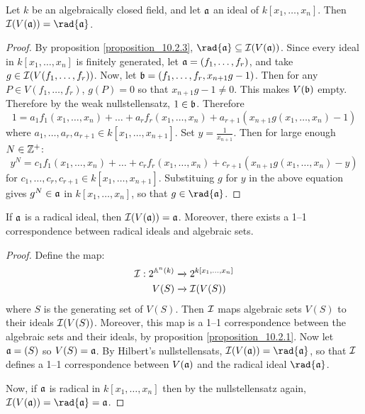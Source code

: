 \begin{theorem}\label{theorem_10.5.2}
  Let $k$ be an algebraically closed field, and let $\af$ an ideal of
  $k[x_1, \dots, x_n]$. Then $\Ic(V(\af))=\rad{\af}$.
\end{theorem}
\begin{proof}
  By proposition \ref{proposition_10.2.3}, $\rad{\af} \subseteq
  \Ic(V(\af))$. Since every ideal in $k[x_1, \dots, x_n]$ is finitely
  generated, let $\af=(f_1, \dots, f_r)$, and take $g \in \Ic(V(f_1,
  \dots, f_r))$. Now, let $\bf=(f_1, \dots, f_r, x_{n+1}g-1)$. Then
  for any $P \in V(f_1, \dots, f_r)$, $g(P)=0$ so that $x_{n+1}g-1
  \neq 0$. This makes $V(\bf)$ empty. Therefore by the weak
  nullstellensatz, $1 \in \bf$. Therefore
  \begin{equation*}
    1=a_1f_1(x_1, \dots, x_n)+\dots+a_rf_r(x_1, \dots, x_n)+
    a_{r+1}(x_{n+1}g(x_1, \dots, x_n)-1)
  \end{equation*}
  where $a_1, \dots, a_r,a_{r+1} \in k[x_1, \dots, x_{n+1}]$. Set
  $y=\frac{1}{x_{n+1}}$. Then for large enough $N \in \Z^+$:
  \begin{equation*}
    y^N=c_1f_1(x_1, \dots, x_n)+\dots+c_rf_r(x_1, \dots, x_n)+
    c_{r+1}(x_{n+1}g(x_1, \dots, x_n)-y)
  \end{equation*}
  for $c_1, \dots, c_r,c_{r+1} \in k[x_1, \dots, x_{n+1}]$.
  Substituing $g$ for $y$ in the above equation gives $g^N \in \af$ in
  $k[x_1, \dots, x_n]$, so that $g \in \rad{\af}$.
\end{proof}
\begin{corollary}
  If $\af$ is a radical ideal, then $\Ic(V(\af))=\af$. Moreover, there
  exists a 1--1 correspondence between radical ideals and algebraic
  sets.
\end{corollary}
\begin{proof}
  Define the map:
  \begin{align*}
    \Ic: 2^{\A^n(k)} & \xrightarrow{} 2^{k[x_1, \dots, x_n]} \\
        V(S) & \xrightarrow{} \Ic(V(S)) \\
  \end{align*}
  where $S$ is the generating set of $V(S)$. Then $\Ic$ maps algebraic
  sets $V(S)$ to their ideals $\Ic(V(S))$. Moreover, this map is a
  1--1 correspondence between the algebraic sets and their ideals, by
  proposition \ref{proposition_10.2.1}. Now let $\af=(S)$ so
  $V(S)=\af$. By Hilbert's nullstellensats, $\Ic(V(\af))=\rad{\af}$,
  so that $\Ic$ defines a 1--1 correspondence between $V(\af)$ and the
  radical ideal $\rad{\af}$.

  Now, if $\af$ is radical in $k[x_1, \dots, x_n]$ then by the
  nullstellensatz again, $\Ic(V(\af))=\rad{\af}=\af$.
\end{proof}
